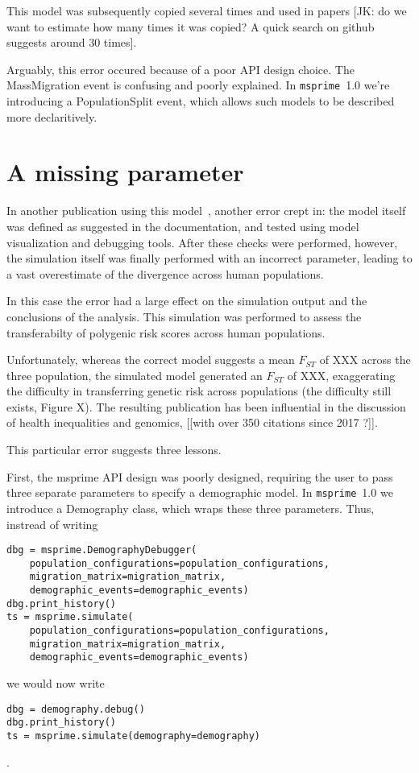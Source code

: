 \documentclass{article}
\newcommand{\msprime}[0]{\texttt{msprime}}
\begin{document}
This model was subsequently copied
several times and used in papers [JK: do we want to estimate how
many times it was copied? A quick search on github suggests around 30
times].

Arguably, this error occured because of a poor API design choice.
The MassMigration event is confusing and poorly explained. In
\msprime\ 1.0 we're introducing a PopulationSplit event, which allows
such models to be described more declaritively.

\section{A missing parameter}

In another publication using this model~\citep{martin2017human}, 
another error crept in: the model itself was defined as suggested 
in the documentation, and tested using model visualization and 
debugging tools. After these checks were performed, however, the simulation 
itself was finally performed with an incorrect parameter, leading to a vast 
overestimate of the divergence across human populations. 

In this case the error had a large effect on the simulation output and 
the conclusions of the analysis. This simulation was performed to assess 
the transferabilty of polygenic risk scores across human populations. 

Unfortunately, whereas the correct model suggests a mean $F_{ST}$ of 
XXX across the three population, the simulated model generated an $F_{ST}$ of 
XXX, exaggerating the difficulty in transferring genetic risk across populations (the difficulty still exists, Figure X).  The resulting
publication has been influential in the discussion of health inequalities and 
genomics, [[with over 350 citations since 2017 ?]]. 

This particular error suggests three lessons. 

First, the msprime API design was poorly designed, requiring the user to pass
three separate parameters to specify a demographic model. 
 In \msprime\ 1.0 we introduce
a Demography class, which wraps these three parameters.
Thus, instread of writing
\begin{lstlisting}[frame=single]
dbg = msprime.DemographyDebugger(
    population_configurations=population_configurations,
    migration_matrix=migration_matrix,
    demographic_events=demographic_events)
dbg.print_history()
ts = msprime.simulate(
    population_configurations=population_configurations,
    migration_matrix=migration_matrix,
    demographic_events=demographic_events)
\end{lstlisting}
we would now write
\begin{lstlisting}[frame=single]
dbg = demography.debug()
dbg.print_history()
ts = msprime.simulate(demography=demography)
\end{lstlisting}.
\end{document}
